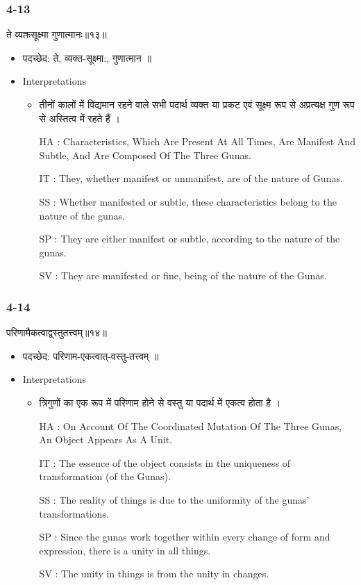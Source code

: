 \begin{frame}[fragile]\frametitle{4-13}
\begin{sanskrit}
ते व्यक्तसूक्ष्मा गुणात्मानः॥१३॥
\end{sanskrit}

	\begin{itemize}
	\item पदच्छेद:  ते, व्यक्त-सूक्ष्मा:, गुणात्मान ॥
	\item Interpretations
		\begin{itemize}	
		\item तीनों कालों में विद्यमान रहने वाले सभी पदार्थ व्यक्त या प्रकट एवं सूक्ष्म रूप से अप्रत्यक्ष गुण रूप से अस्तित्व में रहते हैं ।
		\item [HA]: Characteristics, Which Are Present At All Times, Are Manifest And Subtle, And Are Composed Of The Three Gunas.
		\item [IT]: They, whether manifest or unmanifest, are of the nature of Gunas.
		\item [SS]: Whether manifested or subtle, these characteristics belong to the nature of the gunas.
		\item [SP]: They are either manifest or subtle, according to the nature of the gunas.
		\item [SV]: They are manifested or fine, being of the nature of the Gunas. 
		\end{itemize}
	\end{itemize}
\end{frame}



\begin{frame}[fragile]\frametitle{4-14}
\begin{sanskrit}
परिणामैकत्वाद्व्स्तुतत्त्वम्॥१४॥ 
\end{sanskrit}

	\begin{itemize}
	\item पदच्छेद:  परिणाम-एकत्वात्-वस्तु-तत्त्वम्‌ ॥
	\item Interpretations
		\begin{itemize}	
		\item त्रिगुणों का एक रूप में परिणाम होने से वस्तु या पदार्थ में एकत्व होता है ।
		\item [HA]: On Account Of The Coordinated Mutation Of The Three Gunas, An Object Appears As A Unit.
		\item [IT]: The essence of the object consists in the uniqueness of transformation (of the Gunas).
		\item [SS]: The reality of things is due to the uniformity of the gunas’ transformations.
		\item [SP]: Since the gunas work together within every change of form and expression, there is a unity in all things.
		\item [SV]: The unity in things is from the unity in changes. 
		\end{itemize}
	\end{itemize}
\end{frame}

